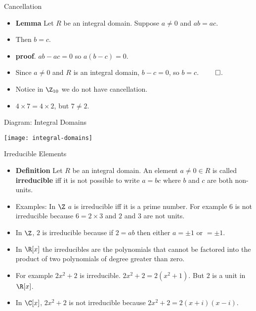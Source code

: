 \documentclass[handout]{beamer}
\begin{document}

\begin{frame}{Cancellation}

\begin{itemize}
  \item \textbf{Lemma} Let $R$ be an integral domain. Suppose $a\not=0$ and $ab = ac$.
  \item Then $b=c$.
  \item \textbf{proof}. $ab - ac = 0$ so $a(b-c) = 0$.
  \item Since $a\not=0$ and $R$ is an integral domain, $b-c=0$, so $b=c$. $\qed$.
  \item Notice in $\Z_{10}$ we do not have cancellation.
  \item $4\times 7 = 4 \times 2$, but $7\not= 2$.
\end{itemize}

\end{frame}



\begin{frame}{Diagram: Integral Domains}

\begin{center}
\texttt{[image: integral-domains]}
\end{center}

\end{frame}



\begin{frame}{Irreducible Elements}

\begin{itemize}
  \item \textbf{Definition} Let $R$ be an integral domain. An element $a\not=0\in R$ is called  \textbf{irreducible} iff it is not possible to write $a=bc$ where
  $b$ and $c$ are both non-units.
  \item Examples: In $\Z$ $a$ is irreducible iff it is a prime number. For example $6$ is not irreducible because $6=2\times 3$ and $2$ and $3$ are not units.
  \item In $\Z$, $2$ is irreducible because if $2=ab$ then either $a=\pm1$ or $=\pm1$.
  \item In $\R[x]$ the irreducibles are the polynomials that cannot be factored into the product of two polynomials of degree greater than zero.
  \item For example $2x^2 + 2$ is irreducible. $2x^2 + 2 = 2 (x^2 + 1)$. But $2$ is a unit in $\R[x]$.
  \item In $\C[x]$, $2x^2+2$ is not irreducible because $2x^2+2= 2(x+i)(x-i)$.
\end{itemize}

\end{frame}
\end{document}
